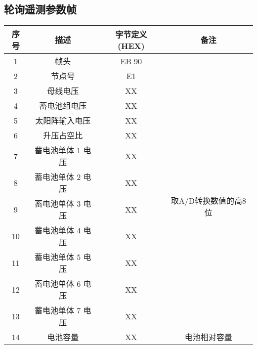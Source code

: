 \documentclass{article}
\begin{document}
\subsection{轮询遥测参数帧}
\makeatletter{}\makeatother 
\begin{tabular}{|c|c|c|c|c|c|c|c|c|c|c|}
\hline
          序号     &      描述                 & \multicolumn{8}{c|}{字节定义(HEX)}	&      备注              \\ \hline
          1        &      帧头                 & \multicolumn{8}{c|}{EB 90}		&                    \\ \hline
          2        &      节点号               & \multicolumn{8}{c|}{E1}			&                    \\ \hline
          3        &      母线电压             & \multicolumn{8}{c|}{XX}   		& \multirow{11}{*}{取A/D转换数值的高8位} \\ \cline{1-10}
          4        &      蓄电池组电压         & \multicolumn{8}{c|}{XX}   			&                    \\ \cline{1-10}
          5        &      太阳阵输入电压       & \multicolumn{8}{c|}{XX} 			&                    \\ \cline{1-10}
          6        &      升压占空比           & \multicolumn{8}{c|}{XX} 			&                    \\ \cline{1-10}
          7        &      蓄电池单体 1 电压    & \multicolumn{8}{c|}{XX} 			&                    \\ \cline{1-10}
          8        &      蓄电池单体 2 电压    & \multicolumn{8}{c|}{XX} 			&                    \\ \cline{1-10}
          9        &      蓄电池单体 3 电压    & \multicolumn{8}{c|}{XX} 			&                    \\ \cline{1-10}
          10       &      蓄电池单体 4 电压    & \multicolumn{8}{c|}{XX} 			&                    \\ \cline{1-10}
          11       &      蓄电池单体 5 电压    & \multicolumn{8}{c|}{XX} 			&                    \\ \cline{1-10}
          12       &      蓄电池单体 6 电压    & \multicolumn{8}{c|}{XX} 			&                    \\ \cline{1-10}
          13       &      蓄电池单体 7 电压    & \multicolumn{8}{c|}{XX} 			&                    \\ \hline
          14       &      电池容量             & \multicolumn{8}{c|}{XX}       &  电池相对容量       \\ \hline
\end{tabular}
\end{document}

